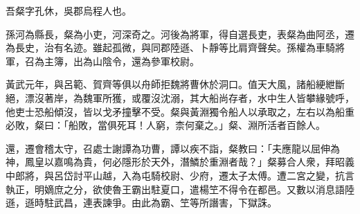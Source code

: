 \begin{pinyinscope}
 
 
 吾粲字孔休，吳郡烏程人也。
 
 
 孫河為縣長，粲為小吏，河深奇之。河後為將軍，得自選長吏，表粲為曲阿丞，遷為長史，治有名迹。雖起孤微，與同郡陸遜、卜靜等比肩齊聲矣。孫權為車騎將軍，召為主簿，出為山陰令，還為參軍校尉。
 
 
 
 
 黃武元年，與呂範、賀齊等俱以舟師拒魏將曹休於洞口。值天大風，諸船綆紲斷絕，漂沒著岸，為魏軍所獲，或覆沒沈溺，其大船尚存者，水中生人皆攀緣號呼，他吏士恐船傾沒，皆以戈矛撞擊不受。粲與黃淵獨令船人以承取之，左右以為船重必敗，粲曰：「船敗，當俱死耳！人窮，柰何棄之。」粲、淵所活者百餘人。
 
 
 
 
 還，遷會稽太守，召處士謝譚為功曹，譚以疾不詣，粲教曰：「夫應龍以屈伸為神，鳳皇以嘉鳴為貴，何必隱形於天外，潛鱗於重淵者哉？」粲募合人衆，拜昭義中郎將，與呂岱討平山越，入為屯騎校尉、少府，遷太子太傅。遭二宮之變，抗言執正，明嫡庶之分，欲使魯王霸出駐夏口，遣楊笁不得令在都邑。又數以消息語陸遜，遜時駐武昌，連表諫爭。由此為霸、笁等所譖害，下獄誅。
 
 
\end{pinyinscope}